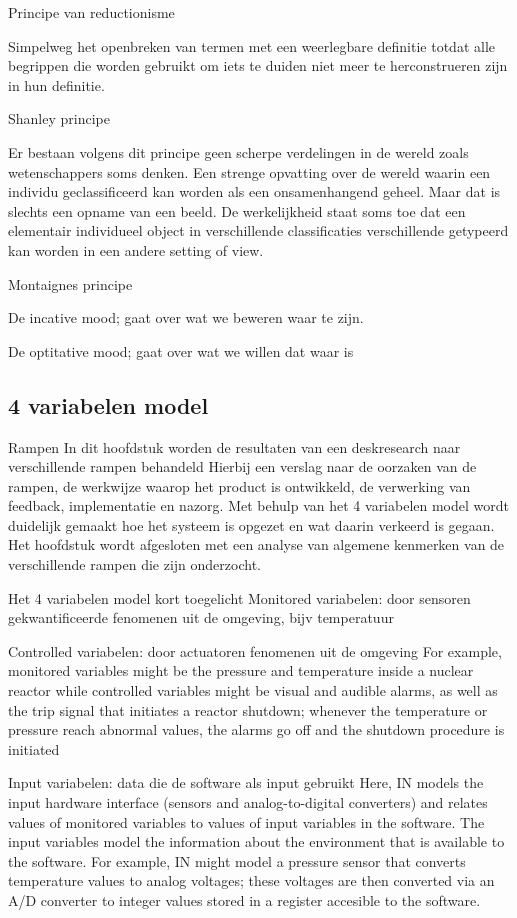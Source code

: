 Principe van reductionisme 

Simpelweg het openbreken van termen met een weerlegbare definitie totdat alle begrippen die worden gebruikt om iets te duiden  niet meer te herconstrueren zijn in hun definitie. 

Shanley principe 

Er bestaan volgens dit principe geen scherpe verdelingen in de wereld zoals wetenschappers soms denken. Een strenge opvatting over de wereld waarin een individu geclassificeerd kan worden als een onsamenhangend geheel. Maar dat is slechts een opname van een beeld. De werkelijkheid staat soms toe dat een elementair individueel object in verschillende classificaties verschillende getypeerd kan worden in een andere setting of view. 

Montaignes principe 

De incative mood; gaat over wat we beweren waar te zijn. 

De optitative mood; gaat over wat we willen dat waar is 
\subsection{4 variabelen model}



Rampen
In dit hoofdstuk worden de resultaten van een deskresearch naar verschillende rampen behandeld
Hierbij een verslag naar de oorzaken van de rampen, de werkwijze waarop het product is ontwikkeld, de verwerking van feedback, implementatie en nazorg.
Met behulp van het 4 variabelen model wordt duidelijk gemaakt hoe het systeem is opgezet en wat daarin verkeerd is gegaan.
Het  hoofdstuk wordt afgesloten met een analyse van algemene kenmerken van de verschillende rampen die zijn onderzocht.


Het 4 variabelen model kort toegelicht
Monitored variabelen: door sensoren gekwantificeerde fenomenen uit de omgeving, bijv temperatuur

Controlled variabelen: door actuatoren \bestuurde fenomenen uit de omgeving
For example, monitored variables might be the pressure and temperature
inside a nuclear reactor while controlled variables might be visual and audible alarms, as well
as the trip signal that initiates a reactor shutdown; whenever the temperature or pressure reach
abnormal values, the alarms go off and the shutdown procedure is initiated

Input variabelen: data die de software als input gebruikt
Here, IN models the input hardware interface (sensors and analog-to-digital converters) and
relates values of monitored variables to values of input variables in the software. The input variables model the information about the environment that is available to the software. For example,
IN might model a pressure sensor that converts temperature values to analog voltages; these voltages are then converted via an A/D converter to integer values stored in a register accesible to the
software.

